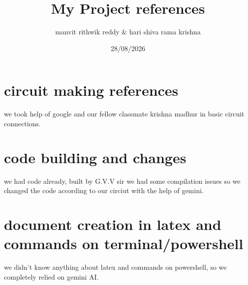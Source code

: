 \documentclass{article}
\title{My Project references}
\author{manvit rithwik reddy & hari shiva rama krishna}
\date{28/08/2026}
\begin{document}
               

\maketitle                     

\section{circuit making references}
we took help of google and our fellow classmate krishna madhur in basic circuit connections.
\section{code building and changes}
we had code already, built by G.V.V sir we had some compilation issues so we changed
the code according to our circiut with the help of gemini.
\section{document creation in latex and commands on terminal/powershell}
we didn't know anything about latex and commands on powershell, so we completely relied on gemini AI.
\end{document}
